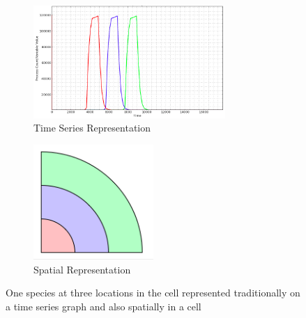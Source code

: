 \begin{figure}[h!]
    \centering
    \begin{subfigure}[b]{0.4\textwidth}
        \centering
        \includegraphics[width=0.8\textwidth]{images/asrc_graph_intro.png}
        \caption{Time Series Representation}
        \label{fig:asrc_graph_intro}
    \end{subfigure}
    \begin{subfigure}[b]{0.4\textwidth}
        \centering
        \includegraphics[width=0.5\textwidth]{images/asrc_cell_intro.png}
        \caption{Spatial Representation}
        \label{fig:asrc_cell_intro}
    \end{subfigure}
    \caption{One species at three locations in the cell represented traditionally on a time series graph and also spatially in a cell}
    \label{fig:asrc_intro}
\end{figure}


